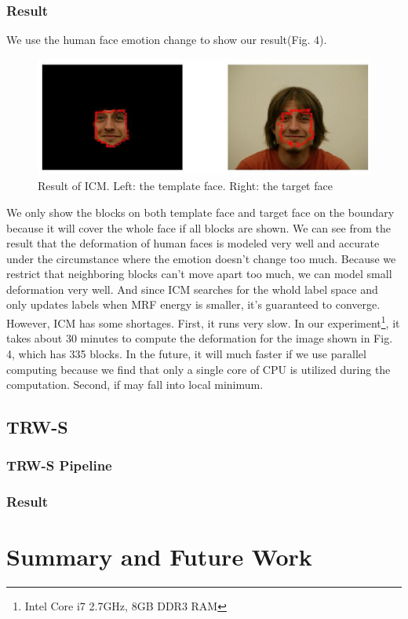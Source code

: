 \documentclass{article} %
\begin{document}
		\subsubsection{Result}
		We use the human face emotion change to show our result(Fig. 4).
		\begin{figure}[!hb]
		\centering
		\includegraphics[scale=0.4]{../Result/new-face3.jpg}
		\caption{Result of ICM. Left: the template face. Right: the target face}
		\end{figure}
		We only show the blocks on both template face and target face on the boundary because it will cover the whole face if all blocks are shown. We can see from the result that the deformation of human faces is modeled very well and accurate under the circumstance where the emotion doesn't change too much. Because we restrict that neighboring blocks can't move apart too much, we can model small deformation very well. And since ICM searches for the whold label space and only updates labels when MRF energy is smaller, it's guaranteed to converge.\\
		However, ICM has some shortages. First, it runs very slow. In our experiment\footnote{Intel Core i7 2.7GHz, 8GB DDR3 RAM}, it takes about 30 minutes to compute the deformation for the image shown in Fig. 4, which has 335 blocks. In the future, it will much faster if we use parallel computing because we find that only a single core of CPU is utilized during the computation. Second, if may fall into local minimum.
	\subsection{TRW-S}
		\subsubsection{TRW-S Pipeline}
		\subsubsection{Result}

\section{Summary and Future Work}


\end{document}
